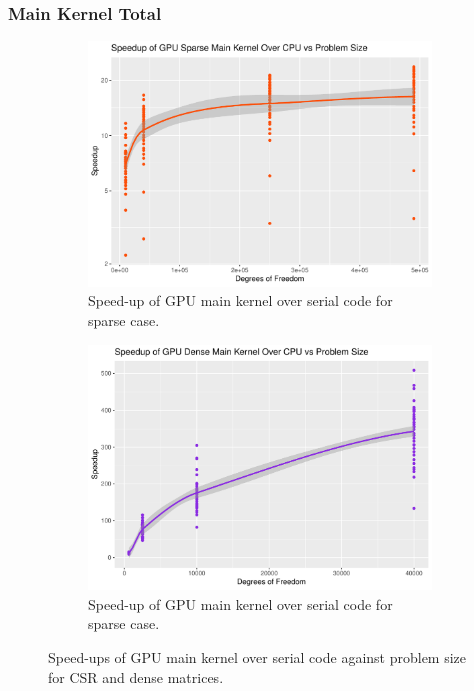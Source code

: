\subsubsection{Main Kernel Total}

\begin{figure}
	\centering
	\begin{subfigure}{0.48\linewidth}
		\centering
		\includegraphics[width = \linewidth]{Plots/elems_p_assem_ker_cpu_sparse_speedup_vs_n}
		\caption{Speed-up of GPU main kernel over serial code for sparse case.}
		\label{fig:kern_sparse_n}
	\end{subfigure}\hfill
	\begin{subfigure}{0.48\linewidth}
		\centering
		\includegraphics[width=\linewidth]{Plots/elems_p_assem_ker_cpu_dense_speedup_vs_n}
		\caption{Speed-up of GPU main kernel over serial code for sparse case.}
		\label{fig:kern_dense_n}
	\end{subfigure}
	\caption{Speed-ups of GPU main kernel over serial code against problem size for CSR and dense matrices.}
	\label{fig:kern_su_n}
\end{figure}


